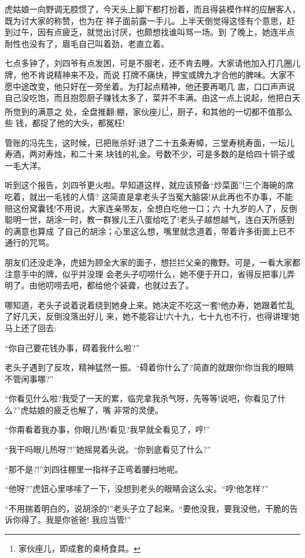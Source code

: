 \documentclass[11pt,a4paper,onecolumn]{article}
\begin{document}
虎姑娘一向野调无腔惯了，今天头上脚下都打扮着，而且得装模作样的应酬客人，既为讨大家的称赞，也为在
祥子面前露一手儿。上半天倒觉得这怪有个意思，赶到过午，因有点疲乏，就觉出讨厌，也颇想找谁叫骂一场。到
了晚上，她连半点耐性也没有了，眉毛自己叫着劲，老直立着。

七点多钟了，刘四爷有点发困，可是不服老，还不肯去睡。大家请他加入打几圈儿牌，他不肯说精神来不及，而说
打牌不痛快，押宝或牌九才合他的脾味。大家不愿中途改变，他只好在一旁坐着。为打起点精神，他还要再喝几
盅，口口声声说自己没吃饱，而且抱怨厨子赚钱太多了，菜并不丰满。由这一点上说起，他把白天所觉到的满意之
处，全盘推翻:棚，家伙座儿\footnote{家伙座儿，即成套的桌椅食具。}，厨子，和其他的一切都不值那么些
钱，都捉了他的大头，都冤枉!

管账的冯先生，这时候，已把账杀好:进了二十五条寿幛，三堂寿桃寿面，一坛儿寿酒，两对寿烛，和二十来
块钱的礼金。号数不少，可是多数的是给四十铜子或一毛大洋。

听到这个报告，刘四爷更火啦。早知道这样，就应该预备``炒菜面''!三个海碗的席吃着，就出一毛钱的人情?
这简直是拿老头子当冤大脑袋!从此再也不办事，不能赔这份窝囊钱!不用说，大家连亲带友，全想白吃他一口；六
十九岁的人了，反倒聪明一世，胡涂一时，教一群猴儿王八蛋给吃了!老头子越想越气，连白天所感到的满意也算成
了自己的胡涂；心里这么想，嘴里就念道着，带着许多街面上已不通行的咒骂。

朋友们还没走净，虎妞为顾全大家的面子，想拦拦父亲的撒野。可是，一看大家都注意手中的牌，似乎并没理
会老头子叨唠什么，她不便于开口，省得反把事儿弄明了。由他叨唠去吧，都给他个装聋，也就过去了。

哪知道，老头子说着说着绕到她身上来。她决定不吃这一套!他办寿，她跟着忙乱了好几天，反倒没落出好儿
来，她不能容让!六十九，七十九也不行，也得讲理!她马上还了回去:

``你自己要花钱办事，碍着我什么啦?''

老头子遇到了反攻，精神猛然一振。``碍着你什么了?简直的就跟你!你当我的眼睛不管闲事哪?''

``你看见什么啦?我受了一天的累，临完拿我杀气呀，先等等!说吧，你看见了什么?''虎姑娘的疲乏也解了，嘴
非常的灵便。

``你甭看着我办事，你眼儿热!看见?我早就全看见了，哼!''

``我干吗眼儿热呀?!''她摇晃着头说。``你到底看见了什么?''

``那不是?!''刘四往棚里一指\myrule 祥子正弯着腰扫地呢。

``他呀?''虎妞心里哆嗦了一下，没想到老头的眼睛会这么尖。``哼!他怎样?''

``不用揣着明白的，说胡涂的!''老头子立了起来。``要他没我，要我没他，干脆的告诉你得了。我是你爸爸!
我应当管!''
\end{document}
